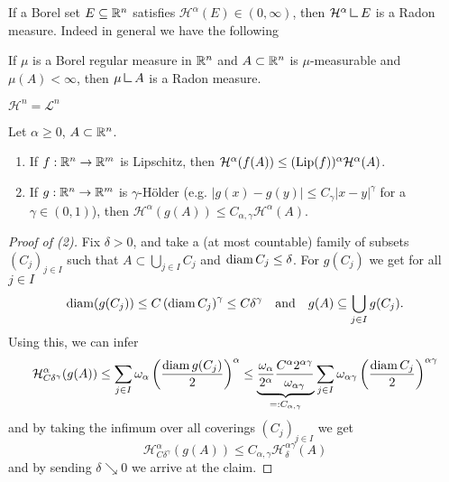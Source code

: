 If a Borel set $E \subseteq \mathbb{R}^n$ satisfies $\mathcal{H}^\alpha(E) \in
(0,\infty)$, then $\mathcal{H}^\alpha \mres E$ is a Radon measure. Indeed in
general we have the following

\begin{theorem}
If $\mu$ is a Borel regular measure in $\mathbb{R}^n$ and $A \subset \mathbb{R}^n$ is
$\mu$-measurable and $\mu(A) < \infty$, then $\mu \mres A$ is a Radon measure. 
\end{theorem}

\begin{theorem}
$\mathcal{H}^n = \mathcal{L}^n$
\end{theorem}

\begin{proposition}
Let $\alpha \geq 0$, $A \subset \mathbb{R}^n$.
\begin{enumerate}[(1)]
\item If $f : \mathbb{R}^n \to \mathbb{R}^m$ is Lipschitz, then $\mathcal{H}^\alpha(f(A)) \leq
(\operatorname{Lip}(f))^\alpha \mathcal{H}^\alpha(A)$.
\item If $g : \mathbb{R}^n \to \mathbb{R}^m$ is $\gamma$-Hölder (e.g. $|g(x) - g(y)| \leq
C_\gamma |x-y|^\gamma$ for a $\gamma \in (0,1)$), then $\mathcal{H}^\alpha(g(A)) \leq
C_{\alpha,\gamma} \mathcal{H}^\alpha(A)$.
\end{enumerate}
\end{proposition}
\begin{proof}[Proof of (2)]
Fix $\delta > 0$, and take a (at most countable) family of subsets $(C_j)_{j\in I}$
such that $ A \subset \bigcup_{j\in I} C_j$ and $\operatorname{diam} C_j \leq \delta$.
For $g(C_j)$ we get for all $j\in I$
\[
\begin{aligned}
\operatorname{diam}(g(C_j)) \leq C \left(\operatorname{diam} C_j\right)^\gamma \leq C \delta^\gamma
\quad \text{and} \quad
g(A) \subseteq \bigcup_{j\in I} g(C_j).
\end{aligned}
\]
Using this, we can infer
\[
\begin{aligned}
\mathcal{H}^\alpha_{C \delta^\gamma}(g(A)) \leq \sum_{j\in I} \omega_\alpha
\left(\frac{\operatorname{diam} g(C_j)}{2}\right)^\alpha
\leq 
\underbrace{\frac{\omega_\alpha}{2^\alpha} \frac{C^\alpha
2^{\alpha\gamma}}{\omega_{\alpha\gamma}}}_{=: C_{\alpha,\gamma}} \sum_{j\in I} \omega_{\alpha \gamma} 
\left(\frac{\operatorname{diam} C_j}{2}\right)^{\alpha\gamma}
\end{aligned}
\]
and by taking the infimum over all coverings $(C_j)_{j\in I}$ we get
\[
\mathcal{H}^\alpha_{C\delta^\gamma} (g(A)) \leq C_{\alpha,\gamma}
\mathcal{H}^{\alpha\gamma}_\delta (A)
\]
and by sending $\delta \searrow 0 $ we arrive at the claim.
\end{proof}
